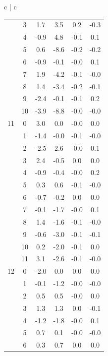 \documentclass[11pt,dvipsnames]{thesis}
\begin{document}
\begin{table}[H]
{\begin{tabular}{c | c}
\begin{tabular}{cc S[table-format=-2.1] S[table-format=-2.1] S[table-format=-1.1] S[table-format=-1.1]}
   &  3&       1.7&       3.5&        0.2&       -0.3 \\
   &  4&      -0.9&       4.8&       -0.1&        0.1 \\
   &  5&       0.6&      -8.6&       -0.2&       -0.2 \\
   &  6&      -0.9&      -0.1&       -0.0&        0.1 \\
   &  7&       1.9&      -4.2&       -0.1&       -0.0 \\
   &  8&       1.4&      -3.4&       -0.2&       -0.1 \\
   &  9&      -2.4&      -0.1&       -0.1&        0.2 \\
  & 10&      -3.9&      -8.8&       -0.0&       -0.0 \\
11 &  0&       3.0&       0.0&       -0.0&        0.0 \\
   &  1&      -1.4&      -0.0&       -0.1&       -0.0 \\
   &  2&      -2.5&       2.6&       -0.0&        0.1 \\
   &  3&       2.4&      -0.5&        0.0&        0.0 \\
   &  4&      -0.9&      -0.4&       -0.0&        0.2 \\
   &  5&       0.3&       0.6&       -0.1&       -0.0 \\
   &  6&      -0.7&      -0.2&        0.0&        0.0 \\
   &  7&      -0.1&      -1.7&       -0.0&        0.1 \\
   &  8&       1.4&      -1.6&       -0.1&       -0.0 \\
   &  9&      -0.6&      -3.0&       -0.1&       -0.1 \\
   & 10&       0.2&      -2.0&       -0.1&        0.0 \\
   & 11&       3.1&      -2.6&       -0.1&       -0.0 \\
12 &  0&      -2.0&       0.0&        0.0&        0.0 \\
   &  1&      -0.1&      -1.2&       -0.0&       -0.0 \\
   &  2&       0.5&       0.5&       -0.0&        0.0 \\
   &  3&       1.3&       1.3&        0.0&       -0.1 \\
   &  4&      -1.2&      -1.8&       -0.0&        0.1 \\
   &  5&       0.7&       0.1&       -0.0&       -0.0 \\
   &  6&       0.3&       0.7&        0.0&        0.0 \\

\end{tabular}
\end{tabular}}
\end{table}
\end{document}
